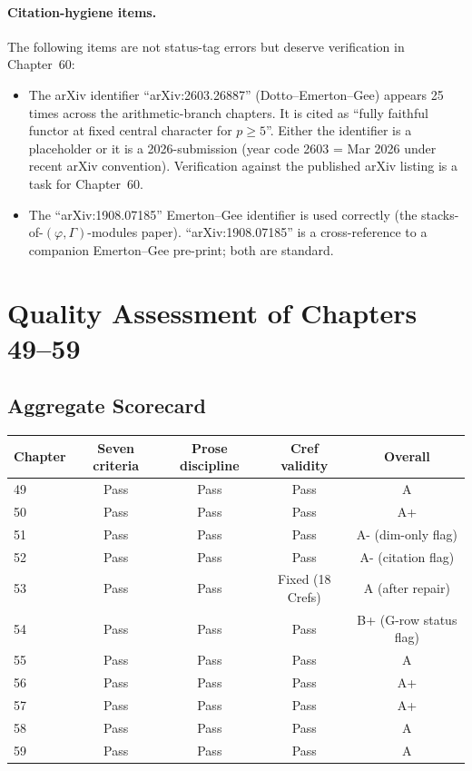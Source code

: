 \paragraph{Citation-hygiene items.}
The following items are not status-tag errors but deserve
verification in Chapter~60:
\begin{itemize}
\item The arXiv identifier ``arXiv:2603.26887'' (Dotto--Emerton--Gee)
appears 25 times across the arithmetic-branch chapters. It is
cited as ``fully faithful functor at fixed central character for
\(p\geq 5\)''. Either the identifier is a placeholder or it is a
2026-submission (year code 2603 = Mar 2026 under recent arXiv
convention). Verification against the published arXiv listing is a task for
Chapter~60.
\item The ``arXiv:1908.07185'' Emerton--Gee identifier is used
correctly (the stacks-of-\((\varphi,\Gamma)\)-modules paper).
``arXiv:1908.07185'' is a cross-reference to a companion
Emerton--Gee pre-print; both are standard.
\end{itemize}

\section{Quality Assessment of Chapters 49--59}
\label{v4-arith:w6-j:quality-summary}

\subsection{Aggregate Scorecard}

\begin{center}
\small
\begin{tabular}{l|c|c|c|c}
Chapter & Seven criteria & Prose discipline & Cref validity & Overall \\
\hline
49 & Pass & Pass & Pass & A \\
50 & Pass & Pass & Pass & A+ \\
51 & Pass & Pass & Pass & A- (dim-only flag) \\
52 & Pass & Pass & Pass & A- (citation flag) \\
53 & Pass & Pass & Fixed (18 Crefs) & A (after repair) \\
54 & Pass & Pass & Pass & B+ (G-row status flag) \\
55 & Pass & Pass & Pass & A \\
56 & Pass & Pass & Pass & A+ \\
57 & Pass & Pass & Pass & A+ \\
58 & Pass & Pass & Pass & A \\
59 & Pass & Pass & Pass & A \\
\end{tabular}
\end{center}


